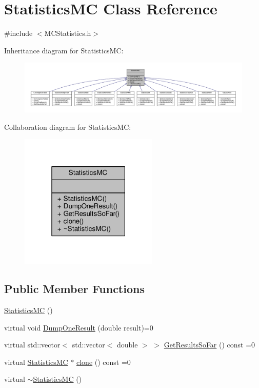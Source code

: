 \hypertarget{classStatisticsMC}{}\section{Statistics\+MC Class Reference}
\label{classStatisticsMC}


{\ttfamily \#include $<$M\+C\+Statistics.\+h$>$}



Inheritance diagram for Statistics\+MC\+:
\nopagebreak
\begin{figure}[H]
\begin{center}
\leavevmode
\includegraphics[width=350pt]{classStatisticsMC__inherit__graph}
\end{center}
\end{figure}


Collaboration diagram for Statistics\+MC\+:
\nopagebreak
\begin{figure}[H]
\begin{center}
\leavevmode
\includegraphics[width=187pt]{classStatisticsMC__coll__graph}
\end{center}
\end{figure}
\subsection*{Public Member Functions}
\begin{DoxyCompactItemize}
\item 
\hyperlink{classStatisticsMC_ad1b428e0652968ebf00aa0b018a470d2}{Statistics\+MC} ()
\item 
virtual void \hyperlink{classStatisticsMC_a3ab5fb27d6933d8e35b2a55c3897cbe3}{Dump\+One\+Result} (double result)=0
\item 
virtual std\+::vector$<$ std\+::vector$<$ double $>$ $>$ \hyperlink{classStatisticsMC_ae29a294b6db36c2bf46c20ac30e25aad}{Get\+Results\+So\+Far} () const =0
\item 
virtual \hyperlink{classStatisticsMC}{Statistics\+MC} $\ast$ \hyperlink{classStatisticsMC_af716d17e088d36f283e112ba736f8002}{clone} () const =0
\item 
virtual \hyperlink{classStatisticsMC_aef119bf7e7b60ba4fb8aaaf3605a564d}{$\sim$\+Statistics\+MC} ()
\end{DoxyCompactItemize}


